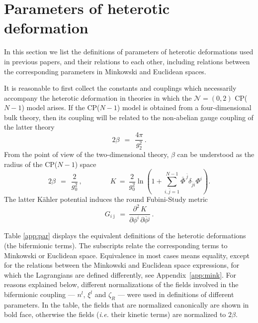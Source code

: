 \documentclass[epsfig,12pt]{article}
\def\beq{\begin{equation}}
\def\eeq{\end{equation}}
\renewcommand{\theequation}{\thesection.\arabic{equation}}
\def\beq{\begin{equation}}
\def\eeq{\end{equation}}
\newcommand{\ntwoo}{${\mathcal N}= \left(0,2\right) $ }
\renewcommand{\theequation}{\thesection.\arabic{equation}}
\newcommand{\p}{\partial}
\newcommand{\ov}{\overline}
\newcommand{\zr}{\zeta_R}
\newcommand{\bj}{{\bar \jmath}}
\begin{document}
{%

\section{Parameters of heterotic deformation}
 \renewcommand{\theequation}{\Alph{section}.\arabic{equation}}
\setcounter{equation}{0}
 
 \renewcommand{\thesubsection}{\Alph{section}.\arabic{subsection}}
\setcounter{subsection}{0}
 \renewcommand{\thetable}{\Alph{section}.\arabic{table}}
\label{app:het}

In this section we list the definitions of parameters of heterotic deformations
used in previous papers, and their relations to each other, including relations
between the corresponding parameters in Minkowski and Euclidean spaces.

It is reasonable to first collect the constants and couplings which necessarily
accompany the heterotic deformation in theories in which the \ntwoo CP($N-1$) model arises.
If the CP($N-1$) model is obtained from a four-dimensional bulk theory, then its coupling
will be related to the non-abelian gauge coupling of the latter theory
\beq
	2\beta ~~=~~ \frac{4\pi}{g_2^2}\,.
\eeq
From the point of view of the two-dimensional theory, $ \beta $ can be understood as the 
radius of the CP($N-1$) space
\beq
	2\beta ~~=~~ \frac{2}{g_0^2}\,,
\qquad\qquad
K ~=~ 
\frac{2}{g_{0}^{2}}\ln\left(1+\sum_{i,\bar j=1}^{ N-1}\bar\Phi^{\,\bar j}\delta_{\bar j i}\Phi^{i}\right).
\eeq
The latter K\"ahler potential induces the round Fubini-Study metric
\beq
G_{i\bj} ~=~ \frac{\p^2\, K}{\p\phi^i\, \p\ov{\phi}{}^\bj}\,.
\eeq

Table \ref{app:par} displays the equivalent definitions of the heterotic deformations
(the bifermionic terms). 
The subscripts relate the corresponding terms to Minkowski or Euclidean space.
Equivalence in most cases means equality, except for the relations between the Minkowski and
Euclidean space expressions, for which the Lagrangians are defined differently, see Appendix~\ref{app:mink}.
For reasons explained below, different normalizations of the fields involved
in the bifermionic coupling --- $ n^l $, $ \xi^l $ and $ \zr $ --- 
were used in definitions of different parameters. 
In the table, the fields that are normalized canonically are shown in bold face, otherwise
the fields ({\it i.e.} their kinetic terms) are normalized to $ 2\beta $.

}
\end{document}

